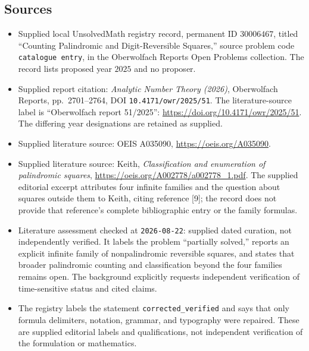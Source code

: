\documentclass[11pt]{article}
\begin{document}
\subsection{Sources}
\begin{itemize}
\item Supplied local UnsolvedMath registry record, permanent ID \(30006467\), titled ``Counting Palindromic and Digit-Reversible Squares,'' source problem code \texttt{catalogue entry}, in the Oberwolfach Reports Open Problems collection. The record lists proposed year \(2025\) and no proposer.
\item Supplied report citation: \emph{Analytic Number Theory (2026)}, Oberwolfach Reports, pp.\ 2701--2764, DOI \texttt{10.4171/owr/2025/51}. The literature-source label is ``Oberwolfach report 51/2025'': \url{https://doi.org/10.4171/owr/2025/51}. The differing year designations are retained as supplied.
\item Supplied literature source: OEIS A035090, \url{https://oeis.org/A035090}.
\item Supplied literature source: Keith, \emph{Classification and enumeration of palindromic squares}, \url{https://oeis.org/A002778/a002778_1.pdf}. The supplied editorial excerpt attributes four infinite families and the question about squares outside them to Keith, citing reference [9]; the record does not provide that reference's complete bibliographic entry or the family formulas.
\item Literature assessment checked at \texttt{2026-08-22}: supplied dated curation, not independently verified. It labels the problem ``partially solved,'' reports an explicit infinite family of nonpalindromic reversible squares, and states that broader palindromic counting and classification beyond the four families remains open. The background explicitly requests independent verification of time-sensitive status and cited claims.
\item The registry labels the statement \texttt{corrected\_verified} and says that only formula delimiters, notation, grammar, and typography were repaired. These are supplied editorial labels and qualifications, not independent verification of the formulation or mathematics.
\end{itemize}
\end{document}
